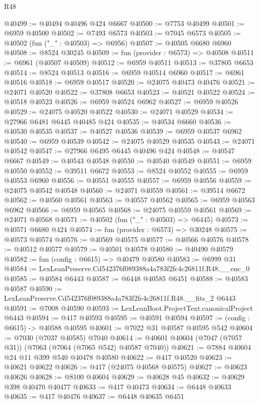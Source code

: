 \begin{lexlean}{R48}
\begin{coremodule}
@40499 := @40494 @40496 @424 @6667
@40500 := @7753 @40499
@40501 := @6959 @40500
@40502 := @7493 @6573
@40503 := @7045 @6573
@40505 := @40502 (fun ("_" : @40503) => @6956)
@40507 := @40505 @6680 @6960
@40508 := @8524 @30245
@40509 := fun (provider : @6573) => @40508
@40511 := @6961 (@40507 @40509)
@40512 := @6959 @40511
@40513 := @37805 @6653
@40514 := @8524 @40513
@40516 := @6959 @40514 @6960
@40517 := @6961 @40516
@40518 := @6959 @40517
@40520 := @24075 @40473 @40476
@40521 := @24071 @40520
@40522 := @37808 @6653
@40523 := @40521 @40522
@40524 := @40518 @40523
@40526 := @6959 @40524 @6962
@40527 := @6959 @40526
@40529 := @24075 @40520 @40522
@40530 := @24071 @40529
@40534 := @27966 @6481 @6445 @40485 @424
@40535 := @40534 @6660
@40536 := @40530 @40535
@40537 := @40527 @40536
@40539 := @6959 @40537 @6962
@40540 := @6959 @40539
@40542 := @24075 @40529 @40535
@40543 := @24071 @40542
@40547 := @27966 @6495 @6445 @40496 @424
@40548 := @40547 @6667
@40549 := @40543 @40548
@40550 := @40540 @40549
@40551 := @6959 @40550
@40552 := @39511 @6672
@40553 := @8524 @40552
@40555 := @6959 @40553 @6960
@40556 := @40551 @40555
@40557 := @6959 @40556
@40559 := @24075 @40542 @40548
@40560 := @24071 @40559
@40561 := @39514 @6672
@40562 := @40560 @40561
@40563 := @40557 @40562
@40565 := @6959 @40563 @6962
@40566 := @6959 @40565
@40568 := @24075 @40559 @40561
@40569 := @24071 @40568
@40571 := @40502 (fun ("_" : @40503) => @6445)
@40573 := @40571 @6680 @424
@40574 := fun (provider : @6573) => @30248
@40575 := @40573 @40574
@40576 := @40569 @40575
@40577 := @40566 @40576
@40578 := @40512 @40577
@40579 := @40501 @40578
@40580 := @40490 @40579
@40582 := fun (config : @6615) => @40479 @40580
@40583 := @6999 @31
@40584 := LexLeanPreserve.Cd542376f089388a4a783f2fc4c26811f.R48.__enc_0
@40585 := @40584 @6443
@40587 := @6448 @40585 @6451
@40588 := @40583 @40587
@40590 := LexLeanPreserve.Cd542376f089388a4a783f2fc4c26811f.R48.__fits_2 @6443
@40591 := @7008 @40590
@40593 := LexLeanBoot.ProjectText.canonicalProject @6443
@40594 := @417 @40593
@40595 := @40591 @40594
@40597 := (config : @6615) -> @40588 @40595
@40601 := @7022 @31 @40587 @40595 @542
@40604 := @7030 (@7037 @40585) @7040
@40614 := @40601 @40604 (@7047 (@7057 @31)) (@7063 (@7064 (@7065 @542) @40587 @7040))
@40621 := @7884 @40604 @24 @11 @399 @540 @40478 @40580
@40622 := @417 @40520
@40623 := @40621 @40622
@40626 := @417 (@24075 @40568 @40575)
@40627 := @40623 @40626
@40628 := @8100 @40604
@40629 := @40628 @45
@40632 := @40629 @398 @40470 @40477
@40633 := @417 @40473
@40634 := @6448 @40633
@40635 := @417 @40476
@40637 := @6448 @40635 @6451

\end{coremodule}
\end{lexlean}
